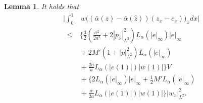 \documentclass[10pt,a4paper]{amsart}
\newtheorem{lemma}{Lemma}
\begin{document}
\begin{lemma}
It holds that 
\begin{align}
\bigg|\int_{0}^{1}&w\big(\left(\bar{\alpha}(z)-\bar{\alpha}(\hat{z})\right)(z_x-e_x)\big)_x dx\bigg| \nonumber 
\end{align}
\begin{align}
\leq&~ \bigg\{ \frac{3}{2}\left(\frac{\sigma^2}{2a^2}+2|p_x|_{L^2}^2\right)L_{\alpha}(|e|_{\infty})|e|_{\infty} \nonumber \\
&~+2M'\left(1+|p|_{L^2}^2\right)L_{\alpha}(|e|_{\infty}) \nonumber \\
&~+\frac{2\sigma}{a}L_{\alpha}(|e(1)|)|w(1)|\bigg\}V \nonumber \\
&~+\bigg\{2L_{\alpha}(|e|_{\infty})|e|_{\infty} +\frac{1}{2}M'L_{\alpha}(|e|_{\infty}) \nonumber \\
&~+\frac{\sigma}{2a}L_{\alpha}(|e(1)|)|w(1)|\bigg\}|w_x|_{L^2}^2. \label{F_B_1}
\end{align}
\hfill  
\end{lemma}
\end{document}
